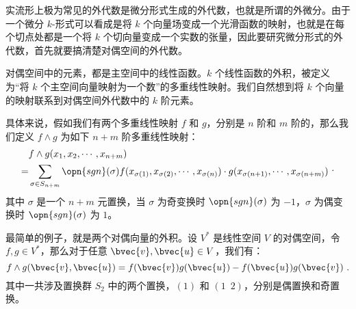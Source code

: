 实流形上极为常见的外代数是微分形式生成的外代数，也就是所谓的外微分。由于一个微分 $k$-形式可以看成是将 $k$ 个向量场变成一个光滑函数的映射，也就是在每个切点处都是一个将 $k$ 个切向量变成一个实数的张量，因此要研究微分形式的外代数，首先就要搞清楚对偶空间的外代数。

对偶空间中的元素，都是主空间中的线性函数。$k$ 个线性函数的外积，被定义为“将 $k$ 个主空间向量映射为一个数”的多重线性映射。我们自然想到将 $k$ 个向量的映射联系到对偶空间外代数中的 $k$ 阶元素。

具体来说，假如我们有两个多重线性映射 $f$ 和 $g$，分别是 $n$ 阶和 $m$ 阶的，那么我们定义 $f\wedge g$ 为如下 $n+m$ 阶多重线性映射：
\begin{equation}
\begin{aligned}
&f\wedge g(x_1, x_2, \cdots, x_{n+m})\\=
&\sum\limits_{\sigma\in S_{n+m}}\opn{sgn}(\sigma) f(x_{\sigma(1)}, x_{\sigma(2)}, \cdots, x_{\sigma(n)})\cdot g(x_{\sigma(n+1)}, \cdots, x_{\sigma(n+m)})
\end{aligned}~.
\end{equation}
其中 $\sigma$ 是一个 $n+m$ 元置换，当 $\sigma$ 为奇变换时 $\opn{sgn}(\sigma)$ 为 $-1$，$\sigma$ 为偶变换时 $\opn{sgn}(\sigma)$ 为 $1$。

最简单的例子，就是两个对偶向量的外积。设 $V^*$ 是线性空间 $V$ 的对偶空间，令 $f, g\in V^*$，那么对于任意 $\bvec{v}, \bvec{u}\in V$，我们有：
\begin{equation}
f\wedge g(\bvec{v}, \bvec{u})=f(\bvec{v})g(\bvec{u})-f(\bvec{u})g(\bvec{v})~.
\end{equation}
其中一共涉及置换群 $S_2$ 中的两个置换，$(1)$ 和 $(1\phantom{2}2)$，分别是偶置换和奇置换。
